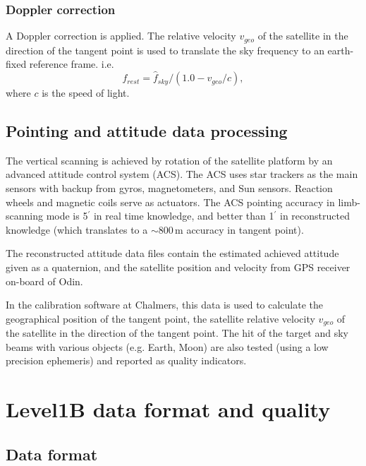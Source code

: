 

\subsection{Doppler correction}

A Doppler correction is applied.
The relative velocity \(v_{geo}\) of the satellite in the direction
of the tangent point is used to translate the sky frequency to an 
earth-fixed reference frame. i.e.
\begin{equation}
f_{rest} = \hat{f}_{sky}/(1.0 - v_{geo}/c),
\end{equation}
where \(c\) is the speed of light.

\section{Pointing and attitude data processing}

The vertical scanning is achieved by rotation of the satellite
platform by an advanced attitude control system (ACS). 
The ACS uses star trackers as the main sensors with backup from gyros, 
magnetometers, and Sun sensors. Reaction wheels and magnetic coils serve as 
actuators. The ACS pointing accuracy in limb-scanning mode is 5\(^{'}\) in
real time knowledge, and better than 1\(^{'}\) in reconstructed knowledge
(which translates to a \(\sim\)800\,m accuracy in tangent point).

The reconstructed attitude data files contain the estimated
achieved attitude given as a quaternion, and the satellite position   
and velocity from GPS receiver on-board of Odin.

In the calibration software at Chalmers, this data is used to calculate
the geographical position of the tangent point, the satellite relative velocity 
\(v_{geo}\) of the satellite in the direction of the tangent point.
The hit of the target and sky beams with various objects (e.g. Earth, Moon) 
are also tested (using a low precision ephemeris)
and reported as quality indicators.


\chapter{Level1B data format and quality}



\section{Data format}

